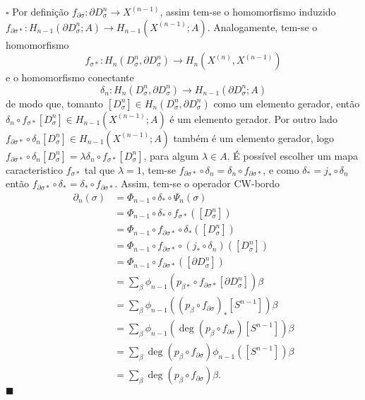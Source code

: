 \documentclass[12pt]{book}
\newenvironment{prova}[1]{$\square$ #1}{\hfill$\blacksquare$}
\newcommand{\celula}[2]{D^{#1}_{#2}}
\newcommand{\celulabordo}[2]{\partial D^{#1}_{#2}}
\newcommand{\homologia}[2]{H_{#1}(#2;A)}
\newcommand{\homologiarelcel}[3]{H_{#1}(D^{#2}_{#3}, \partial D^{#2}_{#3})}
\newcommand{\homologiarelskelesimpl}[2]{H_{#1}(X^{(#2)}, X^{(#2-1)})}
\newcommand{\skeleton}[1]{X^{(#1)}}
\begin{document}
\begin{prova}
		Por definição $f_{\partial\sigma}: \celulabordo{n}{\sigma} \to \skeleton{n-1}$, assim tem-se o homomorfismo induzido $f_{\partial\sigma*}: \homologia{n-1}{\celulabordo{n}{\sigma} }\to \homologia{n-1}{\skeleton{n-1}}$. Analogamente, tem-se o homomorfismo 
		$$
		f_{\sigma*}:\homologiarelcel{n}{n}{\sigma} \to \homologiarelskelesimpl{n}{n}
		$$ 
		e o homomorfismo conectante 
		$$
		\delta_{n} : \homologiarelcel{n}{n}{\sigma} \to \homologia{n-1}{\celulabordo{n}{\sigma}}
		$$ de modo que, tomanto $[\celula{n}{\sigma}] \in \homologiarelcel{n}{n}{\sigma}$ como um elemento gerador, então $\delta_{n}\circ f_{\sigma*}[\celula{n}{\sigma}] \in \homologia{n-1}{\skeleton{n-1}}$ é um elemento gerador. Por outro lado $f_{\partial\sigma*}\circ \delta_{n}[\celula{n}{\sigma}] \in \homologia{n-1}{\skeleton{n-1}}$ também é um elemento gerador, logo $f_{\partial\sigma*}\circ \delta_{n}[\celula{n}{\sigma}] = \lambda \delta_{n}\circ f_{\sigma*}[\celula{n}{\sigma}]$, para algum $\lambda \in A$. É possível escolher um mapa caracteristico $f_{\sigma *}$ tal que $\lambda = 1$, tem-se $f_{\partial\sigma*}\circ \delta_{n} = \delta_{n}\circ f_{\partial\sigma*}$, e como $\delta_{*} = j_{*}\circ\delta_{n}$ então $f_{\partial\sigma*}\circ \delta_{*} = \delta_{*}\circ f_{\partial\sigma*}$. Assim, tem-se o operador CW-bordo
		$$
		\begin{aligned}
		\partial_{n}(\sigma) &= \Phi_{n-1}\circ\delta_{*}\circ\Psi_{n}(\sigma)
		\\
		&= \Phi_{n-1}\circ\delta_{*}\circ f_{\sigma*}([\celula{n}{\sigma}])
		\\
		&= \Phi_{n-1}\circ f_{\partial\sigma*}\circ\delta_{*}([\celula{n}{\sigma}])
		\\
		&= \Phi_{n-1}\circ f_{\partial\sigma*}\circ (j_{*}\circ \delta_{n}) ([\celula{n}{\sigma}])
		\\
		&= \Phi_{n-1} \circ f_{\partial\sigma*}([\celulabordo{n}{\sigma}])
		\\
		&= \sum_{\beta} \phi_{n-1}(p_{\beta*}\circ f_{\partial\sigma*}[\celulabordo{n}{\sigma}])\beta
		\\
		&= \sum_{\beta} \phi_{n-1}((p_{\beta}\circ f_{\partial\sigma})_{*}[S^{n-1}])\beta
		\\
		&= \sum_{\beta} \phi_{n-1}(\deg(p_{\beta}\circ f_{\partial\sigma})[S^{n-1}])\beta
		\\
		&= \sum_{\beta} \deg(p_{\beta}\circ f_{\partial\sigma})\phi_{n-1}([S^{n-1}])\beta
		\\
		&= \sum_{\beta} \deg(p_{\beta}\circ f_{\partial\sigma})\beta.
		\end{aligned}
		$$
	\end{prova}
	
\end{document}
